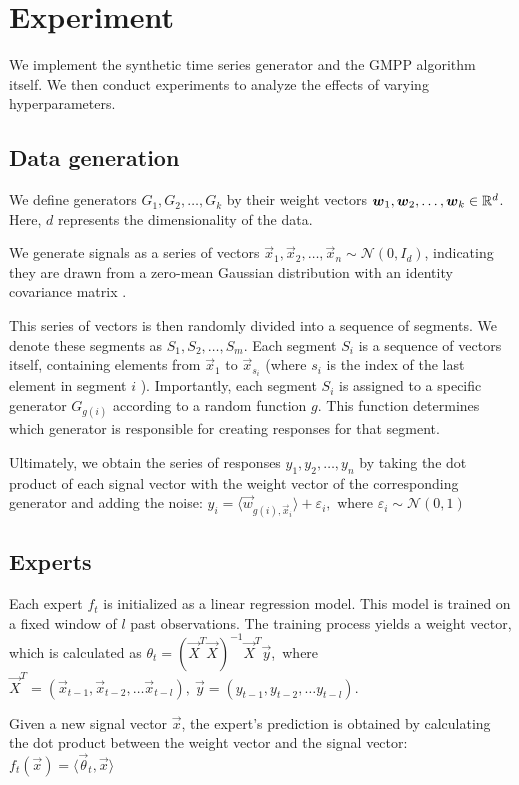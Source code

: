 \documentclass[12pt, twoside]{article}
\begin{document}
\section{Experiment}
We implement the synthetic time series generator and the GMPP algorithm itself. 
We then conduct experiments to analyze the effects of varying hyperparameters.
\subsection{Data generation}

We define generators $G_1, G_2, \dots, G_k$ by their weight vectors $\boldsymbol{w}_1, \boldsymbol{w}_2, \dots, \boldsymbol{w}_k \in \mathbb{R}^d$. 
Here, $d$ represents the dimensionality of the data.

We generate signals as a series of vectors $\vec x_1, \vec x_2, \dots, \vec x_n \sim \mathcal{N}(0, I_d)$, indicating they are drawn from a zero-mean Gaussian distribution with an identity covariance matrix .

This series of vectors is then randomly divided into a sequence of segments. 
We denote these segments as $S_1, S_2, \dots, S_m$. 
Each segment $S_i$ is a sequence of vectors itself, containing elements from $\vec x_1$ to $\vec x_{s_i}$ (where $s_i$ is the index of the last element in segment $i$ ). 
Importantly, each segment $S_i$ is assigned to a specific generator $G_{g(i)}$ according to a random function $g$. 
This function determines which generator is responsible for creating responses for that segment.

Ultimately, we obtain the series of responses $y_1, y_2, \dots, y_n$ by taking the dot product of each signal vector with the weight vector of the corresponding  generator and adding the noise: $y_i = \langle \vec w_{g(i), \vec x_i} \rangle + \varepsilon_i,$ where $\varepsilon_i \sim \mathcal{N}(0, 1)$ 

\subsection{Experts}

Each expert $f_t$ is initialized as a linear regression model. This model is trained on a fixed window of $l$ past observations. The training process yields a weight vector, which is calculated as  $\theta_t = (\vec X^T\vec X)^{-1}\vec X^T\vec y$,\ where $\vec X^T = (\vec x_{t-1}, \vec x_{t-2}, \dots \vec x_{t-l}),\ \vec y = (y_{t-1}, y_{t-2}, \dots y_{t-l})$. 

Given a new signal vector  $\vec x$, the expert's prediction is obtained by calculating the dot product between the weight vector and the signal vector: $f_t(\vec x) = \langle \vec \theta_t, \vec x \rangle$ 
\end{document}
